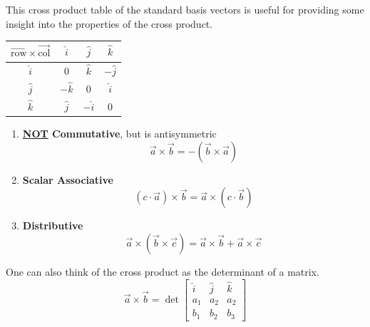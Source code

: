 \noindent
This cross product table of the standard basis vectors is useful for providing some insight into the properties of the cross product.
\begin{table}[H]
	\centering
	\renewcommand{\arraystretch}{1.5}
	\begin{tabular}{|c||c|c|c|}
		\hline
		$\overrightarrow{\text{row}}\times\overrightarrow{\text{col}}$ & $\hat{i}$  & $\hat{j}$  & $\hat{k}$  \\ \hline\hline
		$\hat{i}$                                & $0$        & $\hat{k}$  & $-\hat{j}$ \\ \hline
		$\hat{j}$                                & $-\hat{k}$ & $0$        & $\hat{i}$  \\ \hline
		$\hat{k}$                                & $\hat{j}$  & $-\hat{i}$ & $0$        \\ \hline
	\end{tabular}
\end{table}

\begin{enumerate}[label=]
	\item \textbf{\underline{NOT} Commutative}, but is antisymmetric
		\begin{equation*}
			\vec{a}\times\vec{b} = -\left(\vec{b}\times\vec{a}\right)
		\end{equation*}
	\item \textbf{Scalar Associative}
		\begin{equation*}
			\left(c\cdot\vec{a}\right)\times\vec{b}=\vec{a}\times\left(c\cdot\vec{b}\right)
		\end{equation*}
	\item \textbf{Distributive}
		\begin{equation*}
			\vec{a}\times\left(\vec{b}\times\vec{c}\right) = \vec{a}\times\vec{b} + \vec{a}\times\vec{c}
		\end{equation*}
\end{enumerate}

\noindent
One can also think of the cross product as the determinant of a matrix.
\begin{equation*}
	\vec{a}\times\vec{b} = \det\begin{bmatrix}
		\hat{i}& \hat{j} & \hat{k} \\
		a_1 & a_2 & a_2\\
		b_1 & b_2 & b_3 
	\end{bmatrix}
\end{equation*}